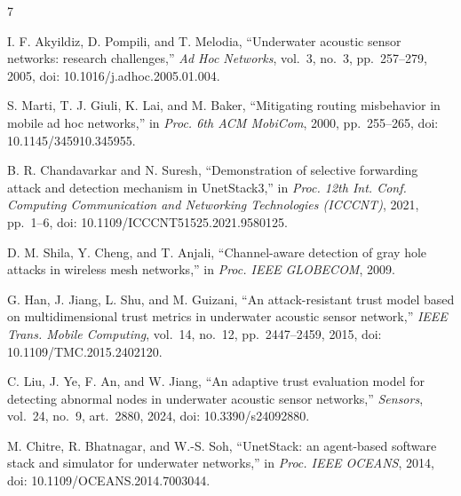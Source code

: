 \documentclass{article}
\begin{document}
\begin{thebibliography}{7}
\raggedright

 I. F. Akyildiz, D. Pompili, and T. Melodia, ``Underwater acoustic sensor networks: research challenges,'' \emph{Ad Hoc Networks}, vol.~3, no.~3, pp.~257--279, 2005, doi: 10.1016/j.adhoc.2005.01.004.

 S. Marti, T. J. Giuli, K. Lai, and M. Baker, ``Mitigating routing misbehavior in mobile ad hoc networks,'' in \emph{Proc. 6th ACM MobiCom}, 2000, pp.~255--265, doi: 10.1145/345910.345955.

 B. R. Chandavarkar and N. Suresh, ``Demonstration of selective forwarding attack and detection mechanism in UnetStack3,'' in \emph{Proc. 12th Int. Conf. Computing Communication and Networking Technologies (ICCCNT)}, 2021, pp.~1--6, doi: 10.1109/ICCCNT51525.2021.9580125.

 D. M. Shila, Y. Cheng, and T. Anjali, ``Channel-aware detection of gray hole attacks in wireless mesh networks,'' in \emph{Proc. IEEE GLOBECOM}, 2009.

 G. Han, J. Jiang, L. Shu, and M. Guizani, ``An attack-resistant trust model based on multidimensional trust metrics in underwater acoustic sensor network,'' \emph{IEEE Trans. Mobile Computing}, vol.~14, no.~12, pp.~2447--2459, 2015, doi: 10.1109/TMC.2015.2402120.

 C. Liu, J. Ye, F. An, and W. Jiang, ``An adaptive trust evaluation model for detecting abnormal nodes in underwater acoustic sensor networks,'' \emph{Sensors}, vol.~24, no.~9, art.~2880, 2024, doi: 10.3390/s24092880.

 M. Chitre, R. Bhatnagar, and W.-S. Soh, ``UnetStack: an agent-based software stack and simulator for underwater networks,'' in \emph{Proc. IEEE OCEANS}, 2014, doi: 10.1109/OCEANS.2014.7003044.

\end{thebibliography}
 
\end{document}
